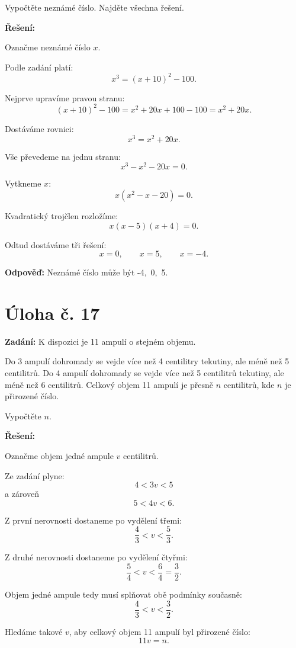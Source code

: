 \documentclass[12pt,a4paper]{article}
\begin{document}
Vypočtěte neznámé číslo. Najděte všechna řešení.

\bigskip

\textbf{Řešení:}

Označme neznámé číslo \(x\).

Podle zadání platí:
\[
x^3=(x+10)^2-100.
\]

Nejprve upravíme pravou stranu:
\[
(x+10)^2-100=x^2+20x+100-100=x^2+20x.
\]

Dostáváme rovnici:
\[
x^3=x^2+20x.
\]

Vše převedeme na jednu stranu:
\[
x^3-x^2-20x=0.
\]

Vytkneme \(x\):
\[
x(x^2-x-20)=0.
\]

Kvadratický trojčlen rozložíme:
\[
x(x-5)(x+4)=0.
\]

Odtud dostáváme tři řešení:
\[
x=0,\qquad x=5,\qquad x=-4.
\]

\bigskip

\textbf{Odpověď:}  
Neznámé číslo může být -4,\ 0,\ 5.


\newpage
\section*{Úloha č. 17}

\textbf{Zadání:}  
K dispozici je 11 ampulí o stejném objemu.

Do 3 ampulí dohromady se vejde více než 4 centilitry tekutiny, ale méně než 5 centilitrů.  
Do 4 ampulí dohromady se vejde více než 5 centilitrů tekutiny, ale méně než 6 centilitrů.  
Celkový objem 11 ampulí je přesně \(n\) centilitrů, kde \(n\) je přirozené číslo.

Vypočtěte \(n\).

\bigskip

\textbf{Řešení:}

Označme objem jedné ampule \(v\) centilitrů.

Ze zadání plyne:
\[
4<3v<5
\]
a zároveň
\[
5<4v<6.
\]

Z první nerovnosti dostaneme po vydělení třemi:
\[
\frac{4}{3}<v<\frac{5}{3}.
\]

Z druhé nerovnosti dostaneme po vydělení čtyřmi:
\[
\frac{5}{4}<v<\frac{6}{4}=\frac{3}{2}.
\]

Objem jedné ampule tedy musí splňovat obě podmínky současně:
\[
\frac{4}{3}<v<\frac{3}{2}.
\]

Hledáme takové \(v\), aby celkový objem 11 ampulí byl přirozené číslo:
\[
11v=n.
\]
\end{document}
